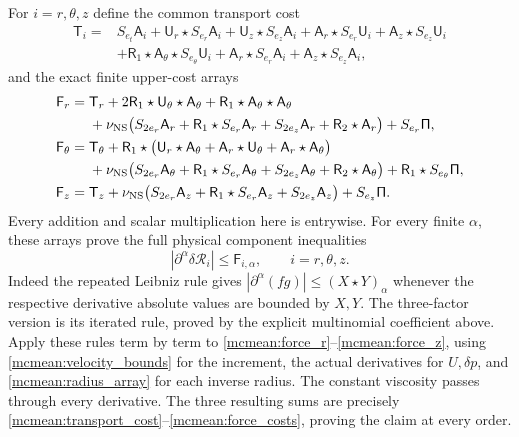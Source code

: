 For \(i=r,\theta,z\) define the common transport cost
\begin{equation}\label{mcmean:transport_cost}
\begin{split}
 \mathsf T_i={}&S_{e_t}\mathsf A_i
 +\mathsf U_r\star S_{e_r}\mathsf A_i
 +\mathsf U_z\star S_{e_z}\mathsf A_i
 +\mathsf A_r\star S_{e_r}\mathsf U_i
 +\mathsf A_z\star S_{e_z}\mathsf U_i\\
 &+\mathsf R_1\star\mathsf A_\theta\star S_{e_\theta}\mathsf U_i
 +\mathsf A_r\star S_{e_r}\mathsf A_i
 +\mathsf A_z\star S_{e_z}\mathsf A_i,
\end{split}
\end{equation}
and the exact finite upper-cost arrays
\begin{equation}\label{mcmean:force_costs}
\begin{split}
 \mathsf F_r={}&\mathsf T_r
    +2\mathsf R_1\star\mathsf U_\theta\star\mathsf A_\theta
    +\mathsf R_1\star\mathsf A_\theta\star\mathsf A_\theta\\
 &+\nu_{\rm NS}\bigl(S_{2e_r}\mathsf A_r
       +\mathsf R_1\star S_{e_r}\mathsf A_r
       +S_{2e_z}\mathsf A_r+\mathsf R_2\star\mathsf A_r\bigr)
       +S_{e_r}\mathsf\Pi,\\
 \mathsf F_\theta={}&\mathsf T_\theta
    +\mathsf R_1\star\bigl(\mathsf U_r\star\mathsf A_\theta
                    +\mathsf A_r\star\mathsf U_\theta
                    +\mathsf A_r\star\mathsf A_\theta\bigr)\\
 &+\nu_{\rm NS}\bigl(S_{2e_r}\mathsf A_\theta
       +\mathsf R_1\star S_{e_r}\mathsf A_\theta
       +S_{2e_z}\mathsf A_\theta+\mathsf R_2\star\mathsf A_\theta\bigr)
       +\mathsf R_1\star S_{e_\theta}\mathsf\Pi,\\
 \mathsf F_z={}&\mathsf T_z
    +\nu_{\rm NS}\bigl(S_{2e_r}\mathsf A_z
       +\mathsf R_1\star S_{e_r}\mathsf A_z
       +S_{2e_z}\mathsf A_z\bigr)+S_{e_z}\mathsf\Pi.
\end{split}
\end{equation}
Every addition and scalar multiplication here is entrywise. For every
finite \(\alpha\), these arrays prove the full physical component
inequalities
\begin{equation}\label{mcmean:all_force_bounds}
 |\partial^\alpha\delta\mathcal R_i|\le\mathsf F_{i,\alpha},
 \qquad i=r,\theta,z.
\end{equation}
Indeed the repeated Leibniz rule gives
\(|\partial^\alpha(fg)|\le(X\star Y)_\alpha\) whenever the
respective derivative absolute values are bounded by \(X,Y\).
The three-factor version is its iterated rule, proved by the explicit
multinomial coefficient above. Apply these rules term by term to
\eqref{mcmean:force_r}--\eqref{mcmean:force_z}, using
\eqref{mcmean:velocity_bounds} for the increment, the actual
derivatives for \(U,\delta p\), and \eqref{mcmean:radius_array} for
each inverse radius. The constant viscosity passes through every
derivative. The three resulting sums are precisely
\eqref{mcmean:transport_cost}--\eqref{mcmean:force_costs}, proving
the claim at every order.

